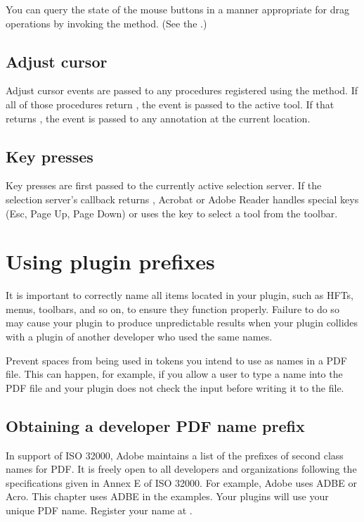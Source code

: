 \documentclass[letterpaper,12pt,english,openany,oneside]{sphinxmanual}
\begin{document}
You can query the state of the mouse buttons in a manner appropriate for drag operations by invoking the  method. (See the .)


\subsection{Adjust cursor}
\label{\detokenize{Plugins_Pimech:adjust-cursor}}
Adjust cursor events are passed to any procedures registered using the  method. If all of those procedures return , the event is passed to the active tool. If that returns , the event is passed to any annotation at the current location.


\subsection{Key presses}
\label{\detokenize{Plugins_Pimech:key-presses}}
Key presses are first passed to the currently active selection server. If the selection server’s  callback returns , Acrobat or Adobe Reader handles special keys (Esc, Page Up, Page Down) or uses the key to select a tool from the toolbar.


\section{Using plugin prefixes}
\label{\detokenize{Plugins_Pimech:using-plugin-prefixes}}
It is important to correctly name all items located in your plugin, such as HFTs, menus, toolbars, and so on, to ensure they function properly. Failure to do so may cause your plugin to produce unpredictable results when your plugin collides with a plugin of another developer who used the same names.

Prevent spaces from being used in tokens you intend to use as names in a PDF file. This can happen, for example, if you allow a user to type a name into the PDF file and your plugin does not check the input before writing it to the file.


\subsection{Obtaining a developer PDF name prefix}
\label{\detokenize{Plugins_Pimech:obtaining-a-developer-pdf-name-prefix}}
In support of ISO 32000, Adobe maintains a list of the prefixes of second class names for PDF. It is freely open to all developers and organizations following the specifications given in Annex E of ISO 32000. For example, Adobe uses ADBE or Acro. This chapter uses ADBE in the examples. Your plugins will use your unique PDF name. Register your name at .
\end{document}

